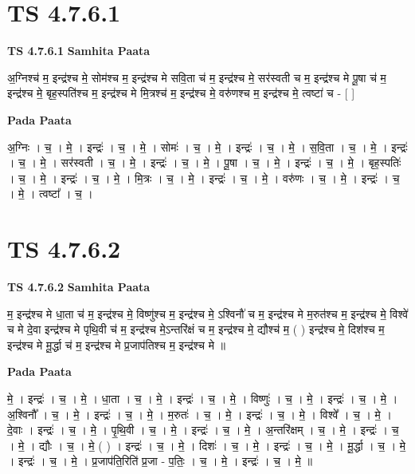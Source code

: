 \documentclass[17pt]{extarticle}
\begin{document}
\section*{ TS 4.7.6.1 }

\textbf{TS 4.7.6.1 } \newline
\textbf{Samhita Paata} \newline

अ॒ग्निश्च॑ म॒ इन्द्र॑श्च मे॒ सोम॑श्च म॒ इन्द्र॑श्च मे सवि॒ता च॑ म॒ इन्द्र॑श्च मे॒ सर॑स्वती च म॒ इन्द्र॑श्च मे पू॒षा च॑ म॒ इन्द्र॑श्च मे॒ बृह॒स्पति॑श्च म॒ इन्द्र॑श्च मे मि॒त्रश्च॑ म॒ इन्द्र॑श्च मे॒ वरु॑णश्च म॒ इन्द्र॑श्च मे॒ त्वष्टा॑ च - [  ] \newline

\textbf{Pada Paata} \newline

अ॒ग्निः । च॒ । मे॒ । इन्द्रः॑ । च॒ । मे॒ । सोमः॑ । च॒ । मे॒ । इन्द्रः॑ । च॒ । मे॒ । स॒वि॒ता । च॒ । मे॒ । इन्द्रः॑ । च॒ । मे॒ । सर॑स्वती । च॒ । मे॒ । इन्द्रः॑ । च॒ । मे॒ । पू॒षा । च॒ । मे॒ । इन्द्रः॑ । च॒ । मे॒ । बृह॒स्पतिः॑ । च॒ । मे॒ । इन्द्रः॑ । च॒ । मे॒ । मि॒त्रः । च॒ । मे॒ । इन्द्रः॑ । च॒ । मे॒ । वरु॑णः । च॒ । मे॒ । इन्द्रः॑ । च॒ । मे॒ । त्वष्टा᳚ । च॒ ।  \newline




\section*{ TS 4.7.6.2 }

\textbf{TS 4.7.6.2 } \newline
\textbf{Samhita Paata} \newline

म॒ इन्द्र॑श्च मे धा॒ता च॑ म॒ इन्द्र॑श्च मे॒ विष्णु॑श्च म॒ इन्द्र॑श्च मे॒ ऽश्विनौ॑ च म॒ इन्द्र॑श्च मे म॒रुत॑श्च म॒ इन्द्र॑श्च मे॒ विश्वे॑ च मे दे॒वा इन्द्र॑श्च मे   पृथि॒वी च॑ म॒ इन्द्र॑श्च मे॒ऽन्तरि॑क्षं च म॒ इन्द्र॑श्च मे॒ द्यौश्च॑ म॒ ( ) इन्द्र॑श्च मे॒ दिश॑श्च म॒ इन्द्र॑श्च मे                मू॒र्द्धा च॑ म॒ इन्द्र॑श्च मे प्र॒जाप॑तिश्च म॒ इन्द्र॑श्च मे ॥ \newline

\textbf{Pada Paata} \newline

मे॒ । इन्द्रः॑ । च॒ । मे॒ । धा॒ता । च॒ । मे॒ । इन्द्रः॑ । च॒ । मे॒ । विष्णुः॑ । च॒ । मे॒ । इन्द्रः॑ । च॒ । मे॒ । अ॒श्विनौ᳚ । च॒ । मे॒ । इन्द्रः॑ । च॒ । मे॒ । म॒रुतः॑ । च॒ । मे॒ । इन्द्रः॑ । च॒ । मे॒ । विश्वे᳚ । च॒ । मे॒ । दे॒वाः । इन्द्रः॑ । च॒ । मे॒ । पृ॒थि॒वी । च॒ । मे॒ । इन्द्रः॑ । च॒ । मे॒ । अ॒न्तरि॑क्षम् । च॒ । मे॒ । इन्द्रः॑ । च॒ । मे॒ । द्यौः । च॒ । मे॒ ( ) । इन्द्रः॑ । च॒ । मे॒ । दिशः॑ । च॒ । मे॒ । इन्द्रः॑ । च॒ । मे॒ । मू॒र्द्धा । च॒ । मे॒ । इन्द्रः॑ । च॒ । मे॒ । प्र॒जाप॑ति॒रिति॑ प्र॒जा - प॒तिः॒ । च॒ । मे॒ । इन्द्रः॑ । च॒ । मे॒ ॥  \newline
\end{document}
